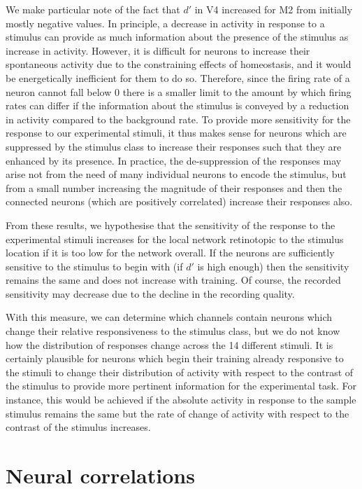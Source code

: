 We make particular note of the fact that $d'$ in \ac{V4} increased for \ac{M2} from initially mostly negative values.
In principle, a decrease in activity in response to a stimulus can provide as much information about the presence of the stimulus as increase in activity.
However, it is difficult for neurons to increase their spontaneous activity due to the constraining effects of homeostasis, and it would be energetically inefficient for them to do so.
Therefore, since the firing rate of a neuron cannot fall below $0$ there is a smaller limit to the amount by which firing rates can differ if the information about the stimulus is conveyed by a reduction in activity compared to the background rate.
To provide more sensitivity for the response to our experimental stimuli, it thus makes sense for neurons which are suppressed by the stimulus class to increase their responses such that they are enhanced by its presence.
In practice, the de-suppression of the responses may arise not from the need of many individual neurons to encode the stimulus, but from a small number increasing the magnitude of their responses and then the connected neurons (which are positively correlated) increase their responses also.

From these results, we hypothesise that the sensitivity of the response to the experimental stimuli increases for the local network retinotopic to the stimulus location if it is too low for the network overall.
If the neurons are sufficiently sensitive to the stimulus to begin with (if $d'$ is high enough) then the sensitivity remains the same and does not increase with training.
Of course, the recorded sensitivity may decrease due to the decline in the recording quality.

With this measure, we can determine which channels contain neurons which change their relative responsiveness to the stimulus class, but we do not know how the distribution of responses change across the 14 different stimuli.
It is certainly plausible for neurons which begin their training already responsive to the stimuli to change their distribution of activity with respect to the contrast of the stimulus to provide more pertinent information for the experimental task.
For instance, this would be achieved if the absolute activity in response to the sample stimulus remains the same but the rate of change of activity with respect to the contrast of the stimulus increases.


\section{Neural correlations}

